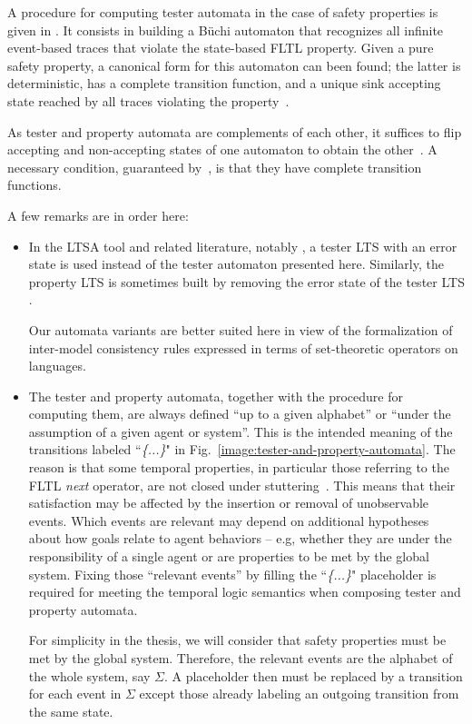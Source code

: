 A procedure for computing tester automata in the case of safety properties is given in \cite{Giannakopoulou:2003}. It consists in building a B\"uchi automaton that recognizes all infinite event-based traces that violate the state-based FLTL property. Given a pure safety property, a canonical form for this automaton can been found; the latter is deterministic, has a complete transition function, and a unique sink accepting state reached by all traces violating the property~\cite{Giannakopoulou:2003}.

As tester and property automata are complements of each other, it suffices to flip accepting and non-accepting states of one automaton to obtain the other~\cite{Hopcroft:1979}. A necessary condition, guaranteed by~\cite{Giannakopoulou:2003}, is that they have complete transition functions.

A few remarks are in order here:
\begin{itemize}
\item In the LTSA tool \cite{Magee:1999} and related literature, notably \cite{Giannakopoulou:2003}, a tester LTS with an error state is used instead of the tester automaton presented here. Similarly, the property LTS is sometimes built by removing the error state of the tester LTS \cite{Letier:2008}. 

Our automata variants are better suited here in view of the formalization of inter-model consistency rules expressed in terms of set-theoretic operators on languages.

\item The tester and property automata, together with the procedure for computing them, are always defined ``up to a given alphabet'' or ``under the assumption of a given agent or system''. This is the intended meaning of the transitions labeled ``\emph{\{...\}}" in Fig.~\ref{image:tester-and-property-automata}. The reason is that some temporal properties, in particular those referring to the FLTL \emph{next} operator, are not closed under stuttering~\cite{Lamport:1994}. This means that their satisfaction may be affected by the insertion or removal of unobservable events. Which events are relevant may depend on additional hypotheses about how goals relate to agent behaviors -- e.g, whether they are under the responsibility of a single agent or are properties to be met by the global system. Fixing those ``relevant events'' by filling the ``\emph{\{...\}}" placeholder is required for meeting the temporal logic semantics when composing tester and property automata. 

For simplicity in the thesis, we will consider that safety properties must be met by the global system. Therefore, the relevant events are the alphabet of the whole system, say $\Sigma$. A placeholder then must be replaced by a transition for each event in $\Sigma$ except those already labeling an outgoing transition from the same state.
\end{itemize}
